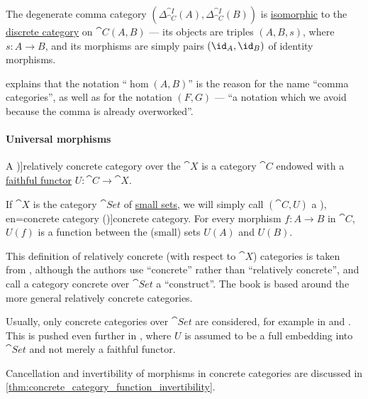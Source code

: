 \begin{comments}
  \item The degenerate comma category \( (\Delta_{\cat{C}}^{\cat{I}}(A), \Delta_{\cat{C}}^{\cat{I}}(B)) \) is \hyperref[def:isomorphism_of_categories]{isomorphic} to the \hyperref[def:discrete_category]{discrete category} on \( \cat{C}(A, B) \) --- its objects are triples \( (A, B, s) \), where \( s: A \to B \), and its morphisms are simply pairs \( (\id_A, \id_B) \) of identity morphisms.

  \Textcite[47]{MacLane1998CategoryTheory} explains that the notation \enquote{\( \hom(A, B) \)} is the reason for the name \enquote{comma categories}, as well as for the notation \( (F, G) \) --- \enquote{a notation which we avoid because the comma is already overworked}.
\end{comments}

\paragraph{Universal morphisms}

\begin{definition}\label{def:concrete_category}
  A \term[en=concrete category (\cite[def. 5.1]{AdámekHerrlichStrecker2004JoyOfCats})]{relatively concrete category} over the  \( \cat{X} \) is a category \( \cat{C} \) endowed with a \hyperref[def:functor_invertibility/faithful]{faithful functor} \( U: \cat{C} \to \cat{X} \).

  If \( \cat{X} \) is the category \hyperref[def:category_of_small_sets]{\( \cat{Set} \)} of \hyperref[def:small_set]{small sets}, we will simply call \( (\cat{C}, U) \) a \term[ru=конкретная категория (\cite[228]{ЦаленкоШульгейфер1974ОсновыТеорииКатегорий}), en=concrete category (\cite[26]{MacLane1998CategoryTheory})]{concrete category}. For every morphism \( f: A \to B \) in \( \cat{C} \), \( U(f) \) is a function between the (small) sets \( U(A) \) and \( U(B) \).
\end{definition}
\begin{comments}
  \item This definition of relatively concrete (with respect to \( \cat{X} \)) categories is taken from \cite[def. 5.1]{AdámekHerrlichStrecker2004JoyOfCats}, although the authors use \enquote{concrete} rather than \enquote{relatively concrete}, and call a category concrete over \( \cat{Set} \) a \enquote{construct}. The book is based around the more general relatively concrete categories.

  Usually, only concrete categories over \( \cat{Set} \) are considered, for example in \cite[26]{MacLane1998CategoryTheory} and \cite[def. 1.6.17]{Riehl2016CategoryTheory}. This is pushed even further in \cite[228]{ЦаленкоШульгейфер1974ОсновыТеорииКатегорий}, where \( U \) is assumed to be a full embedding into \( \cat{Set} \) and not merely a faithful functor.

  \item Cancellation and invertibility of morphisms in concrete categories are discussed in \cref{thm:concrete_category_function_invertibility}.
\end{comments}


